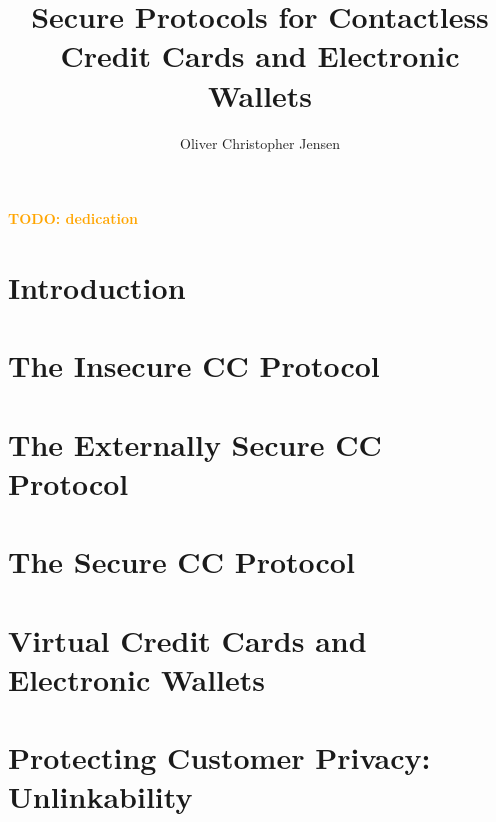\documentclass[12pt]{report}
\author{Oliver Christopher Jensen}
\title{Secure Protocols for Contactless Credit Cards and Electronic Wallets}
\newcommand{\todo}[1]{\textcolor{orange}{\large \bf TODO: #1}}
\begin{document}
\copyrightpage
\commcertpage
\titlepage

\begin{dedication}
%
\todo{dedication}
\end{dedication}

\begin{acknowledgments}		%
%

\end{acknowledgments}

\utabstract
{}
\indent


\tableofcontents
\listoffigures

\chapter{Introduction}
\label{cha:intro}



\chapter{The Insecure CC Protocol}
\label{cha:insecure}





\chapter{The Externally Secure CC Protocol}
\label{cha:external}




\chapter{The Secure CC Protocol}
\label{cha:secure}




\chapter{Virtual Credit Cards and Electronic Wallets}
\label{cha:electronic}


\chapter{Protecting Customer Privacy: Unlinkability}
\label{cha:unlinkability}



\end{document}
